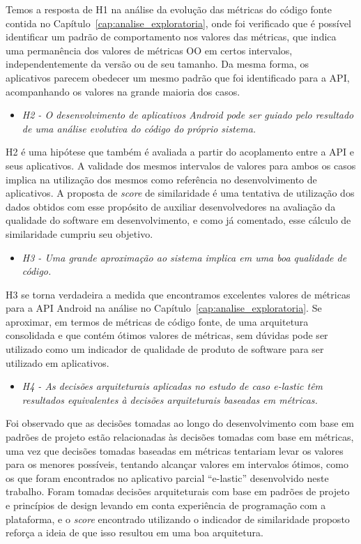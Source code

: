 Temos a resposta de H1 na análise da evolução das métricas do código fonte contida no Capítulo~\ref{cap:analise_exploratoria}, onde foi verificado que é possível identificar um padrão de comportamento nos valores das métricas, que indica uma permanência dos valores de métricas OO em certos intervalos, independentemente da versão ou de seu tamanho. Da mesma forma, os aplicativos parecem obedecer um mesmo padrão que foi identificado para a API, acompanhando os valores na grande maioria dos casos.

\begin{itemize}
\item \textit{H2 - O desenvolvimento de aplicativos Android pode ser guiado pelo resultado de uma análise evolutiva do código do próprio sistema.}
\end{itemize}

H2 é uma hipótese que também é avaliada a partir do acoplamento entre a API e seus aplicativos. A validade dos mesmos intervalos de valores para ambos os casos implica na utilização dos mesmos como referência no desenvolvimento de aplicativos. A proposta de \textit{score} de similaridade é uma tentativa de utilização dos dados obtidos com esse propósito de auxiliar desenvolvedores na avaliação da qualidade do software em desenvolvimento, e como já comentado, esse cálculo de similaridade cumpriu seu objetivo.

\begin{itemize}
\item \textit{H3 - Uma grande aproximação ao sistema implica em uma boa qualidade de código.}
\end{itemize}

H3 se torna verdadeira a medida que encontramos excelentes valores de métricas para a API Android na análise no Capítulo~\ref{cap:analise_exploratoria}. Se aproximar, em termos de métricas de código fonte, de uma arquitetura consolidada e que contém ótimos valores de métricas, sem dúvidas pode ser utilizado como um indicador de qualidade de produto de software para ser utilizado em aplicativos.

\begin{itemize}
\item \textit{H4 - As decisões arquiteturais aplicadas no estudo de caso e-lastic têm resultados equivalentes à decisões arquiteturais baseadas em métricas.}
\end{itemize}

Foi observado que as decisões tomadas ao longo do desenvolvimento com base em padrões de projeto estão relacionadas às decisões tomadas com base em métricas, uma vez que decisões tomadas baseadas em métricas tentariam levar os valores para os menores possíveis, tentando alcançar valores em intervalos ótimos, como os que foram encontrados no aplicativo parcial ``e-lastic'' desenvolvido neste trabalho. Foram tomadas decisões arquiteturais com base em padrões de projeto e princípios de design levando em conta experiência de programação com a plataforma, e o \textit{score} encontrado utilizando o indicador de similaridade proposto reforça a ideia de que isso resultou em uma boa arquitetura.

